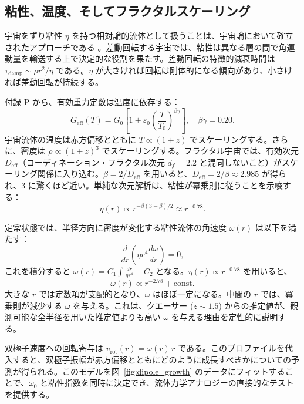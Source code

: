 \documentclass[11pt,a4paper]{article}
\begin{document}
	\subsection{粘性、温度、そしてフラクタルスケーリング}
	
	宇宙をずり粘性 \(\eta\) を持つ相対論的流体として扱うことは、宇宙論において確立されたアプローチである \cite{Giovannini2005}。差動回転する宇宙では、粘性は異なる層の間で角運動量を輸送する上で決定的な役割を果たす。差動回転の特徴的減衰時間は \(\tau_{\mathrm{damp}} \sim \rho r^2 / \eta\) である。\(\eta\) が大きければ回転は剛体的になる傾向があり、小さければ差動回転が持続する。
	
	付録 P から、有効重力定数は温度に依存する：
	\begin{equation}
		G_{\mathrm{eff}}(T) = G_0\left[1 + \varepsilon_0\left(\frac{T}{T_0}\right)^{\beta\gamma}\right], \quad \beta\gamma = 0.20.
	\end{equation}
	宇宙流体の温度は赤方偏移とともに \(T \propto (1+z)\) でスケーリングする。さらに、密度は \(\rho \propto (1+z)^3\) でスケーリングする。フラクタル宇宙では、有効次元 \(D_{\mathrm{eff}}\)（コーディネーション・フラクタル次元 \(d_f = 2.2\) と混同しないこと）がスケーリング関係に入り込む。\(\beta = 2/D_{\mathrm{eff}}\) を用いると、\(D_{\mathrm{eff}} = 2/\beta \approx 2.985\) が得られ、3 に驚くほど近い。単純な次元解析は、粘性が冪乗則に従うことを示唆する：
	\begin{equation}
		\eta(r) \propto r^{-\beta(3-\beta)/2} \approx r^{-0.78}.
	\end{equation}
	
	定常状態では、半径方向に密度が変化する粘性流体の角速度 \(\omega(r)\) は以下を満たす：
	\begin{equation}
		\frac{d}{dr}\left( \eta r^4 \frac{d\omega}{dr} \right) = 0,
	\end{equation}
	これを積分すると \(\omega(r) = C_1 \int \frac{dr}{\eta r^4} + C_2\) となる。\(\eta(r) \propto r^{-0.78}\) を用いると、
	\begin{equation}
		\omega(r) \propto r^{-2.78} + \text{const}.
	\end{equation}
	大きな \(r\) では定数項が支配的となり、\(\omega\) はほぼ一定になる。中間の \(r\) では、冪乗則が減少する \(\omega\) を与える。これは、クエーサー (\(z\sim1.5\)) からの推定値が、観測可能な全半径を用いた推定値よりも高い \(\omega\) を与える理由を定性的に説明する。
	
	双極子速度への回転寄与は \(v_{\mathrm{rot}}(r) = \omega(r) \, r\) である。このプロファイルを代入すると、双極子振幅が赤方偏移とともにどのように成長すべきかについての予測が得られる。このモデルを図~\ref{fig:dipole_growth} のデータにフィットすることで、\(\omega_0\) と粘性指数を同時に決定でき、流体力学アナロジーの直接的なテストを提供する。
	
\end{document}
